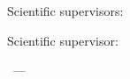 %
\vspace{0pt plus4fill} %
\begin{flushright}
\ifdefined\supervisorTwoFio
Scientific supervisors:

\supervisorRegaliaEn

\ifdefined\supervisorDead
\framebox{\supervisorFioEn}
\else
\supervisorFioEn
\fi

\supervisorTwoRegalia

\ifdefined\supervisorTwoDead
\framebox{\supervisorTwoFio}
\else
\supervisorTwoFio
\fi
\else
Scientific supervisor:

\supervisorRegaliaEn

\ifdefined\supervisorDead
\framebox{\supervisorFioEn}
\else
\supervisorFioEn
\fi
\fi

\end{flushright}
%
\vspace{0pt plus4fill} %
{\centering\thesisCityEn\ --- \thesisYear\par}
